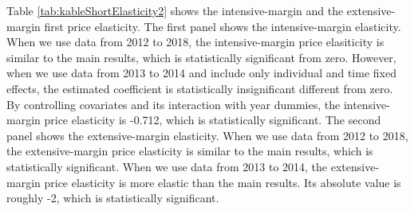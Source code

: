 \documentclass[
  11pt,
  a4paper,
]{article}
\begin{document}
  Table \ref{tab:kableShortElasticity2} shows the intensive-margin and the extensive-margin first price elasticity.
  The first panel shows the intensive-margin elasticity.
  When we use data from 2012 to 2018, the intensive-margin price elasiticity is similar to the main results,
  which is statistically significant from zero.
  However, when we use data from 2013 to 2014 and include only individual and time fixed effects,
  the estimated coefficient is statistically insignificant different from zero.
  By controlling covariates and its interaction with year dummies,
  the intensive-margin price elasticity is -0.712, which is statistically significant.
  The second panel shows the extensive-margin elasticity.
  When we use data from 2012 to 2018, the extensive-margin price elasticity is similar to the main results,
  which is statistically significant.
  When we use data from 2013 to 2014, the extensive-margin price elasticity is more elastic than the main results.
  Its absolute value is roughly -2, which is statistically significant.
\end{document}
